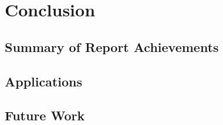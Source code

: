 
\chapter{Conclusion}
\label{ch:conclusions}

\section{Summary of Report Achievements}


\section{Applications}


\section{Future Work}


